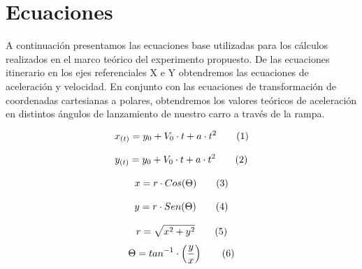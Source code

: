 \documentclass[twocolumn,12pt]{article}
\begin{document}
	\section{Ecuaciones}
 	A continuación presentamos las ecuaciones base utilizadas para los cálculos realizados en el marco teórico del experimento propuesto. De las ecuaciones itinerario en los ejes referenciales X e Y obtendremos las ecuaciones de aceleración y velocidad. En conjunto con las ecuaciones de transformación de coordenadas cartesianas a polares, obtendremos los valores teóricos de aceleración en distintos ángulos de lanzamiento de nuestro carro a través de la rampa.
 	\vspace{-1cm}
 	\begin{center}

 	\begin{equation}
 		\centering
 		x_{(t)} = y_{0} + V_{0} \cdot t + a \cdot t^{2} 
 		\tag*{(1)} %
 	\end{equation}
 		
 	\vspace{-0.8cm}
 	
 	\begin{equation}
 		\centering
 		y_{(t)} = y_{0} + V_{0} \cdot t + a \cdot t^{2} \tag*{(2)} %
 	\end{equation}
 	
 	\vspace{-0.8cm}  
 	
	\centering{}
	
	\begin{equation}
		\centering
		x = r \cdot Cos (\Theta) \tag*{(3)} 
	\end{equation}
	
	\vspace{-0.4cm}
	
	\begin{equation}
		\centering
		y = r \cdot Sen (\Theta) \tag*{(4)} 
	\end{equation}
	
	\vspace{-0.4cm}  
	
	\centering{}
	\centering{}
	
	\begin{equation}
	\centering
	r = \sqrt{x^{2} + y^{2}} \tag*{(5)} 
	\end{equation}
	\vspace{-0.4cm}
	\begin{equation}
	\centering
	\Theta = tan^{-1} \cdot \left( \frac{y}{x} \right) \tag*{(6)} 
	\end{equation}
	\vspace{-0.4cm}  
	\centering{}
	\centering{}
	\end{center}
	
\end{document}
